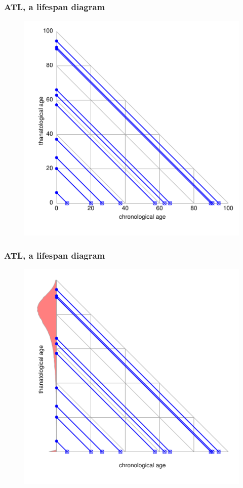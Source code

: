 \documentclass[20pt]{beamer}
\begin{document}
\begin{frame}
\frametitle{ATL, a lifespan diagram}
\begin{figure}[b]
    \centering
    \includegraphics{Figures/LabPres/ATL2.pdf}
\end{figure} 
\end{frame}

\begin{frame}
\frametitle{ATL, a lifespan diagram}
\begin{figure}[b]
    \centering
    \includegraphics{Figures/LabPres/ATL3.pdf}
\end{figure} 
\end{frame}
\end{document}
